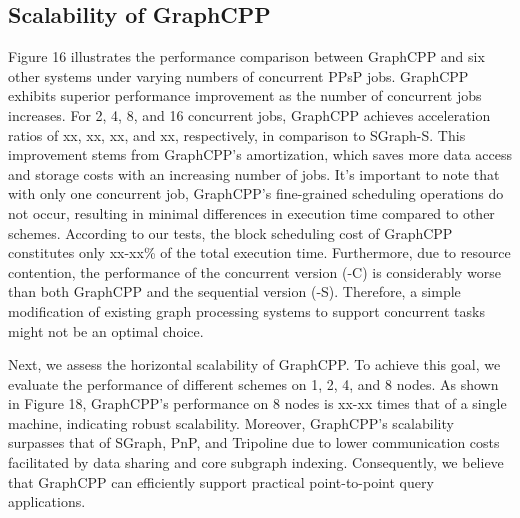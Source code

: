 \documentclass[lettersize,journal]{IEEEtran} %
\begin{document}
\subsection{Scalability of GraphCPP}
Figure 16 illustrates the performance comparison between GraphCPP and six other systems under varying numbers of concurrent PPsP jobs. GraphCPP exhibits superior performance improvement as the number of concurrent jobs increases. For 2, 4, 8, and 16 concurrent jobs, GraphCPP achieves acceleration ratios of xx, xx, xx, and xx, respectively, in comparison to SGraph-S. This improvement stems from GraphCPP's amortization, which saves more data access and storage costs with an increasing number of jobs. It's important to note that with only one concurrent job, GraphCPP's fine-grained scheduling operations do not occur, resulting in minimal differences in execution time compared to other schemes. According to our tests, the block scheduling cost of GraphCPP constitutes only xx-xx\% of the total execution time. Furthermore, due to resource contention, the performance of the concurrent version (-C) is considerably worse than both GraphCPP and the sequential version (-S). Therefore, a simple modification of existing graph processing systems to support concurrent tasks might not be an optimal choice.

Next, we assess the horizontal scalability of GraphCPP. To achieve this goal, we evaluate the performance of different schemes on 1, 2, 4, and 8 nodes. As shown in Figure 18, GraphCPP's performance on 8 nodes is xx-xx times that of a single machine, indicating robust scalability. Moreover, GraphCPP's scalability surpasses that of SGraph\cite{sgraph}, PnP\cite{pnp}, and Tripoline\cite{tripoline} due to lower communication costs facilitated by data sharing and core subgraph indexing. Consequently, we believe that GraphCPP can efficiently support practical point-to-point query applications.
\end{document}
